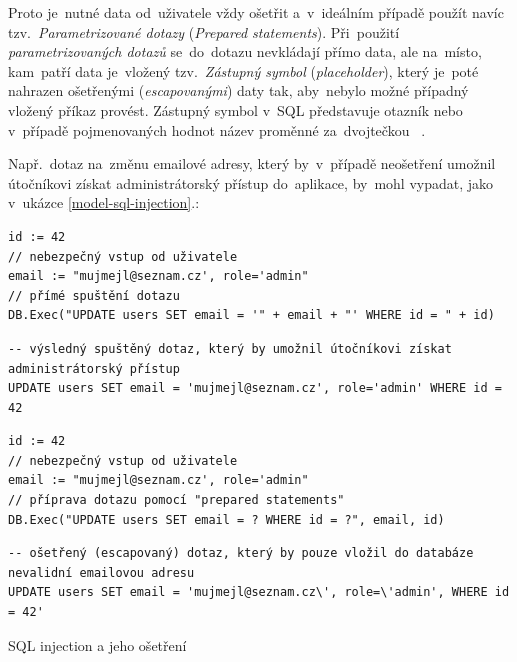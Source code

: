 \documentclass[11pt,a4paper]{report}
\begin{document}
                Proto je~nutné data od~uživatele vždy ošetřit a~v~ideálním případě použít navíc tzv.~\emph{Parametrizované dotazy} (\emph{Prepared statements}). Při~použití \emph{parametrizovaných dotazů} se~do~dotazu nevkládají přímo data, ale na~místo, kam~patří data je~vložený tzv.~\emph{Zástupný symbol} (\emph{placeholder}), který je~poté nahrazen ošetřenými (\emph{escapovanými}) daty tak, aby~nebylo možné případný vložený příkaz provést. Zástupný symbol v~SQL představuje otazník  nebo v~případě pojmenovaných hodnot název proměnné za~dvojtečkou ~\cite{graham2021ethical}.
                
                Např.~dotaz na~změnu emailové adresy, který by~v~případě neošetření umožnil útočníkovi získat administrátorský přístup do~aplikace, by~mohl vypadat, jako v~ukázce \ref{model-sql-injection}.:
                \begin{code}
                    \centering
                    \begin{minipage}{0.48\textwidth}
                        \begin{verbatim}
id := 42
// nebezpečný vstup od uživatele
email := "mujmejl@seznam.cz', role='admin"
// přímé spuštění dotazu
DB.Exec("UPDATE users SET email = '" + email + "' WHERE id = " + id)
                        \end{verbatim}
                        \begin{verbatim}
-- výsledný spuštěný dotaz, který by umožnil útočníkovi získat administrátorský přístup
UPDATE users SET email = 'mujmejl@seznam.cz', role='admin' WHERE id = 42
                        \end{verbatim}
                    \end{minipage}
                    \begin{minipage}{0.48\textwidth}
                        \begin{verbatim}
id := 42
// nebezpečný vstup od uživatele
email := "mujmejl@seznam.cz', role='admin"
// příprava dotazu pomocí "prepared statements"
DB.Exec("UPDATE users SET email = ? WHERE id = ?", email, id)
                        \end{verbatim}
                        \begin{verbatim}
-- ošetřený (escapovaný) dotaz, který by pouze vložil do databáze nevalidní emailovou adresu
UPDATE users SET email = 'mujmejl@seznam.cz\', role=\'admin', WHERE id = 42'
                        \end{verbatim}
                    \end{minipage}
                    \caption{SQL injection a jeho ošetření}
                    \label{model-sql-injection}
                \end{code}
\end{document}
